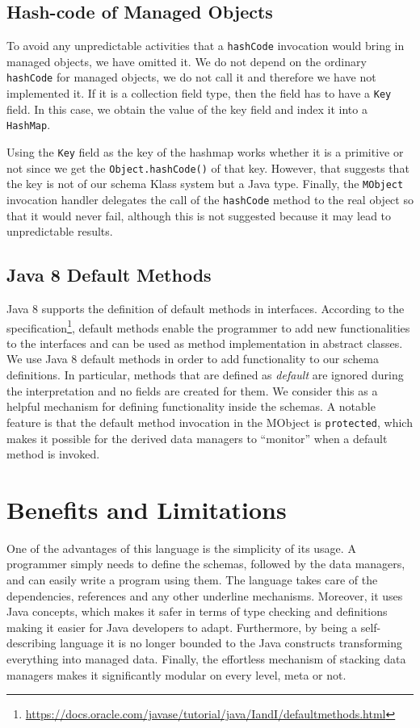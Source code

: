 \subsection{Hash-code of Managed Objects}\label{Hashcode of Managed Objects}
To avoid any unpredictable activities that a \texttt{hashCode} invocation would bring in managed objects, we have omitted it. 
We do not depend on the ordinary \texttt{hashCode} for managed objects, we do not call it and therefore we have not implemented it.
If it is a collection field type, then the field has to have a \texttt{Key} field. 
In this case, we obtain the value of the key field and index it into a \texttt{HashMap}. 

Using the \texttt{Key} field as the key of the hashmap works whether it is a primitive or not since we get the \texttt{Object.hashCode()} of that key.
However, that suggests that the key is not of our schema Klass system but a Java type.
Finally, the \texttt{MObject} invocation handler delegates the call of the \texttt{hashCode} method to the real object so that it would never fail, although this is not suggested because it may lead to unpredictable results.

\subsection{Java 8 Default Methods}\label{Java 8 Default Methods}
Java 8 supports the definition of default methods in interfaces.
According to the specification\footnote{\url{https://docs.oracle.com/javase/tutorial/java/IandI/defaultmethods.html}}, default methods enable the programmer to add new functionalities to the interfaces and can be used as method implementation in abstract classes.
We use Java 8 default methods in order to add functionality to our schema definitions. 
In particular, methods that are defined as \textit{default} are ignored during the interpretation and no fields are created for them.
We consider this as a helpful mechanism for defining functionality inside the schemas.
A notable feature is that the default method invocation in the MObject is \texttt{protected}, which makes it possible for the derived data managers to ``monitor'' when a default method is invoked.

\section{Benefits and Limitations}\label{Benefits and Limitations}
One of the advantages of this language is the simplicity of its usage. 
A programmer simply needs to define the schemas, followed by the data managers, and can easily write a program using them.
The language takes care of the dependencies, references and any other underline mechanisms.
Moreover, it uses Java concepts, which makes it safer in terms of type checking and definitions making it easier for Java developers to adapt.
Furthermore, by being a self-describing language it is no longer bounded to the Java constructs transforming everything into managed data.
Finally, the effortless mechanism of stacking data managers makes it significantly modular on every level, meta or not.

